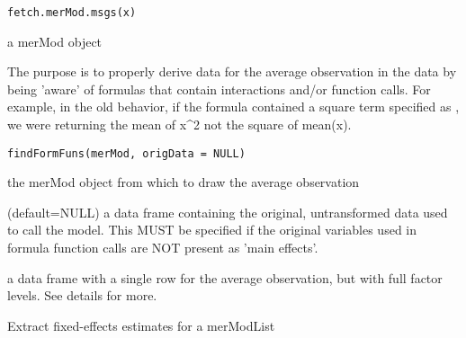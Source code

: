 \documentclass[letterpaper]{book}
\begin{document}
%
\begin{Usage}
\begin{verbatim}
fetch.merMod.msgs(x)
\end{verbatim}
\end{Usage}
%
\begin{Arguments}
\begin{ldescription}
\item[\code{x}] a merMod object
\end{ldescription}
\end{Arguments}
%
\begin{Description}\relax
The purpose is to properly derive data for the average observation in the
data by being 'aware' of formulas that contain interactions and/or function
calls. For example, in the old behavior, if the formula contained a square
term specified as , we were returning the mean of x\textasciicircum{}2 not the
square of mean(x).
\end{Description}
%
\begin{Usage}
\begin{verbatim}
findFormFuns(merMod, origData = NULL)
\end{verbatim}
\end{Usage}
%
\begin{Arguments}
\begin{ldescription}
\item[\code{merMod}] the merMod object from which to draw the average observation

\item[\code{origData}] (default=NULL) a data frame containing the original,
untransformed data used to call the model. This MUST be specified if
the original variables used in formula function calls are NOT present
as 'main effects'.
\end{ldescription}
\end{Arguments}
%
\begin{Value}
a data frame with a single row for the average observation, but with full
factor levels. See details for more.
\end{Value}
%
\begin{Description}\relax
Extract fixed-effects estimates for a merModList
\end{Description}
\end{document}
